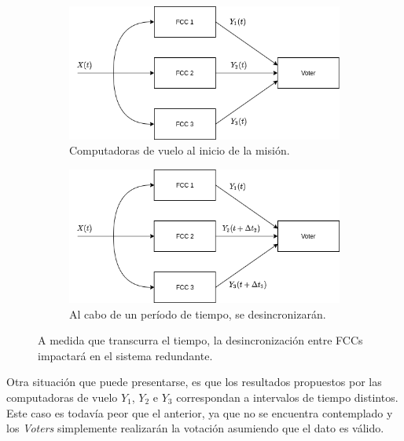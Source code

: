 \begin{figure}[H]
    \centering
    \begin{subfigure}[b]{0.49\textwidth}
        \includegraphics[width=\textwidth]{img/3_4_1_sincronizacion_1.png}
        \caption{Computadoras de vuelo al inicio de la misión.}
        \label{fig:3_4_1_sincronizacion_1}
    \end{subfigure}
    \begin{subfigure}[b]{0.49\textwidth}
        \includegraphics[width=\textwidth]{img/3_4_1_sincronizacion_2.png}
        \caption{Al cabo de un período de tiempo, se desincronizarán.}
        \label{fig:3_4_1_sincronizacion_2}
    \end{subfigure}
    \caption{A medida que transcurra el tiempo, la desincronización entre FCCs impactará en el sistema redundante.}
    \label{fig:3_4_1_sincronizacion}
\end{figure}

Otra situación que puede presentarse, es que los resultados propuestos por las computadoras de vuelo $Y_1$, $Y_2$ e $Y_3$ correspondan a intervalos de tiempo distintos. Este caso es todavía peor que el anterior, ya que no se encuentra contemplado y los \textit{Voters} simplemente realizarán la votación asumiendo que el dato es válido.

